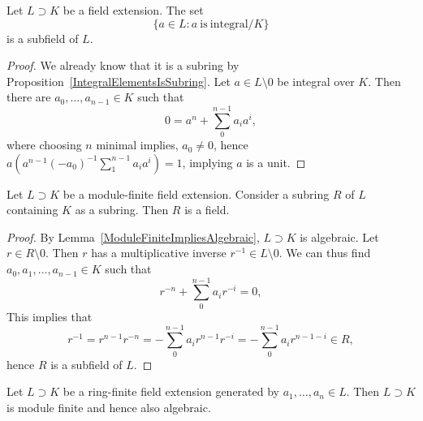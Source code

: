 \begin{proposition}
    Let $L\supset K$ be a field extension. The set 
    $$\{a\in L: a \ \mathrm{is}\ \mathrm{integral}/K\}$$
    is a subfield of $L$.
\end{proposition}
\begin{proof}
    We already know that it is a subring by Proposition~\ref{IntegralElementsIsSubring}. Let $a\in L\setminus 0$ be integral over $K$. Then there are $a_0,\dots,a_{n-1}\in K$ such that 
    $$0= a^n+\sum_0^{n-1} a_ia^{i},$$
    where choosing $n$ minimal implies, $a_0 \neq 0$, hence 
    $a\left(a^{n-1}(-a_0)^{-1}\sum_1^{n-1} a_ia^{i}\right) = 1$, implying $a$ is a unit. 
\end{proof}
\begin{proposition}\label{CannotSqueezeNonFieldBetweenFiniteFieldExtension}
    Let $L\supset K$ be a module-finite field extension. Consider a subring $R$ of $L$ containing $K$ as a subring. Then $R$ is a field. 
\end{proposition}
\begin{proof}
    By Lemma~\ref{ModuleFiniteImpliesAlgebraic}, $L\supset K$ is algebraic. Let $r\in R\setminus 0$. Then $r$ has a multiplicative inverse $r^{-1}\in L\setminus 0$. We can thus find $a_0,a_1,\dots, a_{n-1}\in K$ such that 
    $$r^{-n}+\sum_0^{n-1} a_ir^{-i} = 0,$$
    This implies that 
    $$r^{-1}=r^{n-1}r^{-n} = -\sum_0^{n-1}a_i r^{n-1}r^{-i} = -\sum_0^{n-1} a_ir^{n-1-i}\in R,$$
    hence $R$ is a subfield of $L$. 
\end{proof}
\begin{theorem}
    Let $L\supset K$ be a ring-finite field extension generated by $a_1,\dots,a_n\in L$. Then $L\supset K$ is module finite and hence also algebraic.   
\end{theorem}

